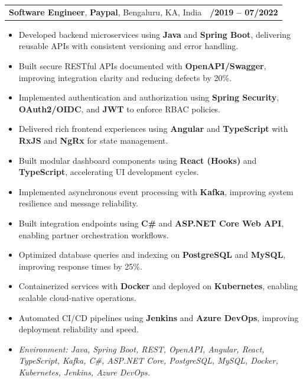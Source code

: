 \documentclass[letterpaper,11pt]{article}
\makeatletter
\newcommand{\resumeItem}[1]{
  \item\footnotesize{
    {#1 \vspace{-2pt}}
  }
}
\newcommand{\resumeSubheading}[4]{
  \vspace{-2pt}\item
    \begin{tabular*}{1.0\textwidth}[t]{l@{\extracolsep{\fill}}r}
      \textbf{\fontsize{10pt}{14pt}\selectfont #3}, \textbf{\fontsize{10pt}{14pt}\selectfont #1}, \fontsize{10pt}{14pt}\selectfont #4 & \textbf{\fontsize{10pt}{14pt}\selectfont #2} \\
    \end{tabular*}\vspace{-7pt}
}
\newcommand{\resumeItemListStart}{\begin{itemize}[leftmargin=*]}
\newcommand{\resumeItemListEnd}{\end{itemize}\vspace{-5pt}}
\makeatother
\begin{document}
\resumeSubheading
{Paypal}{08/2019 -- 07/2022}
{Software Engineer}{Bengaluru, KA, India}
\resumeItemListStart
  \resumeItem{Developed backend microservices using \textbf{Java} and \textbf{Spring Boot}, delivering reusable APIs with consistent versioning and error handling.}
  \resumeItem{Built secure RESTful APIs documented with \textbf{OpenAPI/Swagger}, improving integration clarity and reducing defects by 20\%.}
  \resumeItem{Implemented authentication and authorization using \textbf{Spring Security}, \textbf{OAuth2/OIDC}, and \textbf{JWT} to enforce RBAC policies.}
  \resumeItem{Delivered rich frontend experiences using \textbf{Angular} and \textbf{TypeScript} with \textbf{RxJS} and \textbf{NgRx} for state management.}
  \resumeItem{Built modular dashboard components using \textbf{React (Hooks)} and \textbf{TypeScript}, accelerating UI development cycles.}
  \resumeItem{Implemented asynchronous event processing with \textbf{Kafka}, improving system resilience and message reliability.}
  \resumeItem{Built integration endpoints using \textbf{C\#} and \textbf{ASP.NET Core Web API}, enabling partner orchestration workflows.}
  \resumeItem{Optimized database queries and indexing on \textbf{PostgreSQL} and \textbf{MySQL}, improving response times by 25\%.}
  \resumeItem{Containerized services with \textbf{Docker} and deployed on \textbf{Kubernetes}, enabling scalable cloud-native operations.}
  \resumeItem{Automated CI/CD pipelines using \textbf{Jenkins} and \textbf{Azure DevOps}, improving deployment reliability and speed.}
  \resumeItem{\textit{Environment: Java, Spring Boot, REST, OpenAPI, Angular, React, TypeScript, Kafka, C\#, ASP.NET Core, PostgreSQL, MySQL, Docker, Kubernetes, Jenkins, Azure DevOps.}}
\resumeItemListEnd
\end{document}
